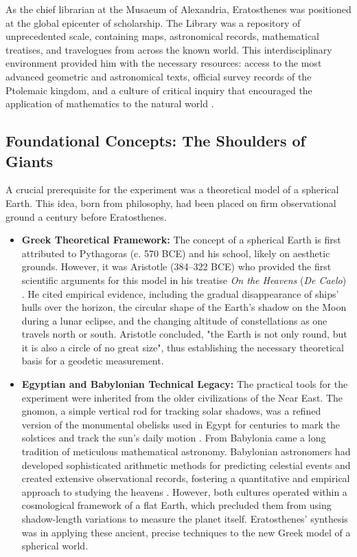 \documentclass[11pt]{article}
\begin{document}
As the chief librarian at the Musaeum of Alexandria, Eratosthenes was positioned at the global epicenter of scholarship. The Library was a repository of unprecedented scale, containing maps, astronomical records, mathematical treatises, and travelogues from across the known world. This interdisciplinary environment provided him with the necessary resources: access to the most advanced geometric and astronomical texts, official survey records of the Ptolemaic kingdom, and a culture of critical inquiry that encouraged the application of mathematics to the natural world \cite{MacLeod2004}.

\subsection{Foundational Concepts: The Shoulders of Giants}

A crucial prerequisite for the experiment was a theoretical model of a spherical Earth. This idea, born from philosophy, had been placed on firm observational ground a century before Eratosthenes.

\begin{itemize}
    \item \textbf{Greek Theoretical Framework:} The concept of a spherical Earth is first attributed to Pythagoras (c. 570 BCE) and his school, likely on aesthetic grounds. However, it was Aristotle (384–322 BCE) who provided the first scientific arguments for this model in his treatise \textit{On the Heavens} (\textit{De Caelo}) \cite{Aristotle350BCE}. He cited empirical evidence, including the gradual disappearance of ships' hulls over the horizon, the circular shape of the Earth's shadow on the Moon during a lunar eclipse, and the changing altitude of constellations as one travels north or south. Aristotle concluded, "the Earth is not only round, but it is also a circle of no great size", thus establishing the necessary theoretical basis for a geodetic measurement.

    \item \textbf{Egyptian and Babylonian Technical Legacy:} The practical tools for the experiment were inherited from the older civilizations of the Near East. The gnomon, a simple vertical rod for tracking solar shadows, was a refined version of the monumental obelisks used in Egypt for centuries to mark the solstices and track the sun's daily motion \cite{Pannekoek1961}. From Babylonia came a long tradition of meticulous mathematical astronomy. Babylonian astronomers had developed sophisticated arithmetic methods for predicting celestial events and created extensive observational records, fostering a quantitative and empirical approach to studying the heavens \cite{Neugebauer1957}. However, both cultures operated within a cosmological framework of a flat Earth, which precluded them from using shadow-length variations to measure the planet itself. Eratosthenes' synthesis was in applying these ancient, precise techniques to the new Greek model of a spherical world.
\end{itemize}
\end{document}
